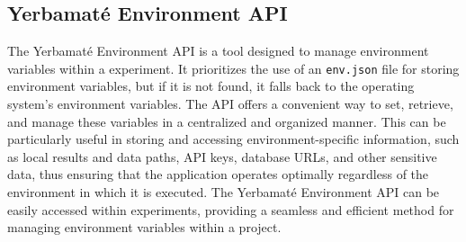 \subsection{Yerbamaté Environment API}

The Yerbamaté Environment API is a tool designed to manage environment variables within a experiment. It prioritizes the use of an \texttt{env.json} file for storing environment variables, but if it is not found, it falls back to the operating system's environment variables. The API offers a convenient way to set, retrieve, and manage these variables in a centralized and organized manner. This can be particularly useful in storing and accessing environment-specific information, such as local results and data paths, API keys, database URLs, and other sensitive data, thus ensuring that the application operates optimally regardless of the environment in which it is executed. The Yerbamaté Environment API can be easily accessed within experiments, providing a seamless and efficient method for managing environment variables within a project. 








